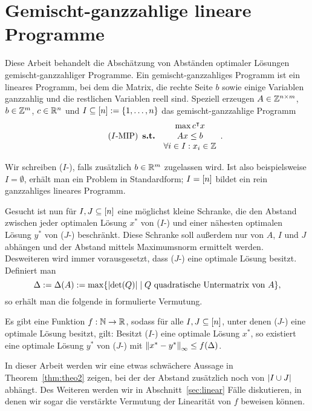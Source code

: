 \section{Gemischt-ganzzahlige lineare Programme}\label{introduction}

Diese Arbeit behandelt die Abschätzung von Abständen optimaler Lösungen
gemischt-ganzzahliger Programme.
Ein gemischt-ganzzahliges Programm ist ein lineares Programm, bei dem die
Matrix, die rechte Seite $b$ sowie einige Variablen ganzzahlig und die
restlichen Variablen reell sind.
Speziell erzeugen $A\in\mathbb{Z}^{n\times m}$, $b\in\mathbb{Z}^m$, $c\in\mathbb{R}^n$ und $I\subseteq[n]:=\{1,\dots,n\}$ das gemischt-ganzzahlige Programm
\begin{equation}\tag{$I$-\MIPI}
\begin{array}{lc}
	&\max c\transpose x \\
	\subjectTo &Ax\leq b\\
	&\forall i\in I: x_i\in\Z
\end{array}.
\end{equation}

Wir schreiben ($I$-\MIPR), falls zusätzlich $b\in\mathbb{R}^m$ zugelassen wird.
Ist also beispielsweise $I=\emptyset$, erhält man ein Problem in Standardform; $I=[n]$ bildet ein rein ganzzahliges lineares Programm.

Gesucht ist nun für $I,J\subseteq[n]$ eine möglichst kleine Schranke, die den Abstand zwischen jeder optimalen Lösung $x^*$ von ($I$-\MIPI) und einer nähesten optimalen Lösung $y^*$ von ($J$-\MIPI) beschränkt.
Diese Schranke soll außerdem nur von $A$, $I$ und $J$ abhängen und der Abstand mittels Maximumsnorm ermittelt werden.
Desweiteren wird immer vorausgesetzt, dass ($J$-\MIPI) eine optimale Lösung besitzt.
Definiert man
$$\Delta:=\Delta(A):=\max\{\lvert  \det(Q) \rvert \mid Q \text{ quadratische Untermatrix von } A \},$$
so erhält man die folgende in \cite{Paat2018} formulierte Vermutung.

\begin{conjecture}\label{con:delta}
	Es gibt eine Funktion $f: \mathbb{N}\rightarrow\mathbb{R}$, sodass für alle $I,J\subseteq[n]$, unter denen ($J$-\MIPI) eine optimale Lösung besitzt, gilt:
	Besitzt ($I$-\MIPI) eine optimale Lösung $x^*$, so existiert eine optimale 
	Lösung $y^*$ von ($J$-\MIPI) mit $\left\lVert x^* - y^*\right\rVert_\infty\leq f(\Delta)$.
\end{conjecture}

In dieser Arbeit werden wir eine etwas schwächere Aussage in Theorem~\ref{thm:theo2} zeigen, bei der der Abstand zusätzlich noch von $\lvert I\cup J \rvert$ abhängt.
Des Weiteren werden wir in Abschnitt~\ref{sec:linear} Fälle diskutieren, in denen wir sogar die verstärkte Vermutung der Linearität von $f$ beweisen können.
